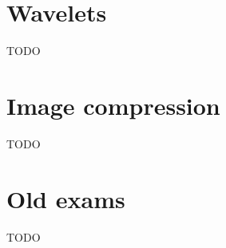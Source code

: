 \documentclass[12pt]{article}
\begin{document}
\section{Wavelets}
	TODO
%	
%
\section{Image compression}
	TODO
%	
%	
\section{Old exams}
	TODO	
\end{document}
